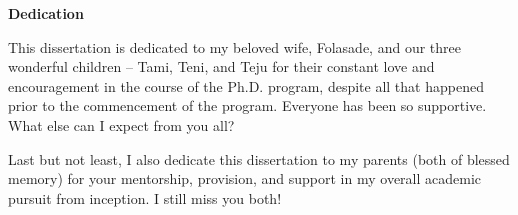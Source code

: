 
%
% 
%

\begin{center}
\textbf{\large Dedication}
\end{center}
This dissertation is dedicated to my beloved wife, Folasade, and our three wonderful children -- Tami, Teni, and Teju for their constant love and encouragement in the course of the Ph.D. program, despite all that happened prior to the commencement of the program. Everyone has been so supportive. What else can I expect from you all?

Last but not least, I also dedicate this dissertation to my parents (both of blessed memory) for your mentorship, provision, and support in my overall academic pursuit from inception. I still miss you both!
